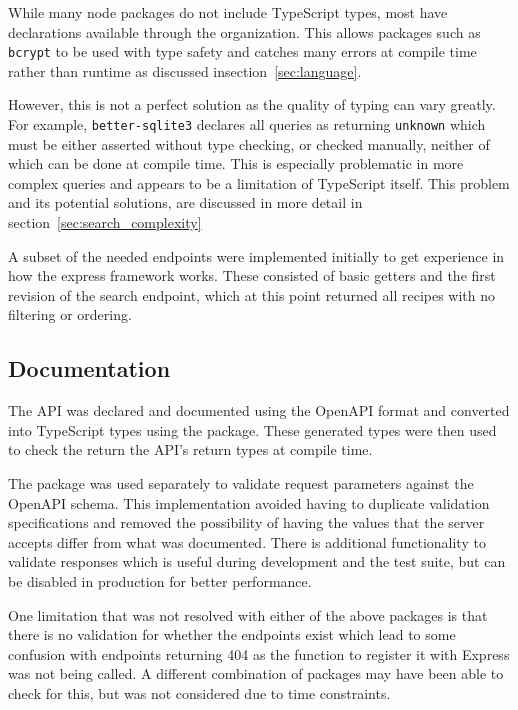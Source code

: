 While many node packages do not include TypeScript types, most have declarations available through the  organization.
This allows packages such as \texttt{bcrypt} to be used with type safety and catches many errors at compile time rather than runtime as discussed
insection~\ref{sec:language}.

However, this is not a perfect solution as the quality of typing can vary greatly. For example, \texttt{better-sqlite3}
declares all queries as returning \texttt{unknown} which must be either asserted without type checking, or checked manually, neither of which
can be done at compile time. This is especially problematic in more complex queries and appears to be a limitation of TypeScript itself. This
problem and its potential solutions, are discussed in more detail in section~\ref{sec:search_complexity}

A subset of the needed endpoints were implemented initially to get experience in how the express framework works.
These consisted of basic getters and the first revision of the search endpoint, which at this point returned all
recipes with no filtering or ordering.

\subsection{Documentation}
The API was declared and documented using the OpenAPI format and converted
into TypeScript types using the  package. These
generated types were then used to check the return the API's return types at compile time.

The  package was used separately to validate
request parameters against the OpenAPI schema. This implementation avoided having
to duplicate validation specifications and removed the possibility of having the values that
the server accepts differ from what was documented. There is additional functionality to validate
responses which is useful during development and the test suite, but can be disabled in production
for better performance.

One limitation that was not resolved with either of the above packages is that there is no validation
for whether the endpoints exist which lead to some confusion with endpoints returning 404 as the function to
register it with Express was not being called. A different combination of packages may have been able to check for this,
but was not considered due to time constraints.

